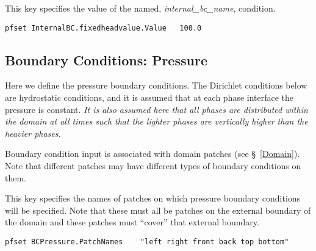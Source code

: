 {
This key specifies the value of the named,
{\em internal\_bc\_name}, condition.
}
\begin{display}\begin{verbatim}
pfset InternalBC.fixedheadvalue.Value   100.0
\end{verbatim}\end{display}


\subsection{Boundary Conditions: Pressure}
\label{Boundary Conditions: Pressure}

Here we define the pressure boundary conditions.
The Dirichlet conditions below are hydrostatic conditions, and it
is assumed that at each phase interface the pressure is constant.
{\em It is also assumed here that all phases
are distributed within the domain at all times such that the lighter phases 
are vertically higher than the heavier phases.}

Boundary condition input is associated with domain patches
(see \S~\ref{Domain}).  Note that different patches may have different types of
boundary conditions on them.


{This key specifies the names of patches on which pressure boundary conditions
will be specified.  Note that these must all be patches on the external
boundary of the domain and these patches must ``cover'' that external boundary.
}
\begin{display}\begin{verbatim}
pfset BCPressure.PatchNames    "left right front back top bottom"
\end{verbatim}\end{display}

